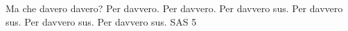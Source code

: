 \documentclass{article}
\begin{document}
Ma che davero davero?
Per davvero.
Per davvero.
Per davvero sus.
Per davvero sus.
Per davvero sus.
Per davvero sus.
SAS 5
\end{document}
